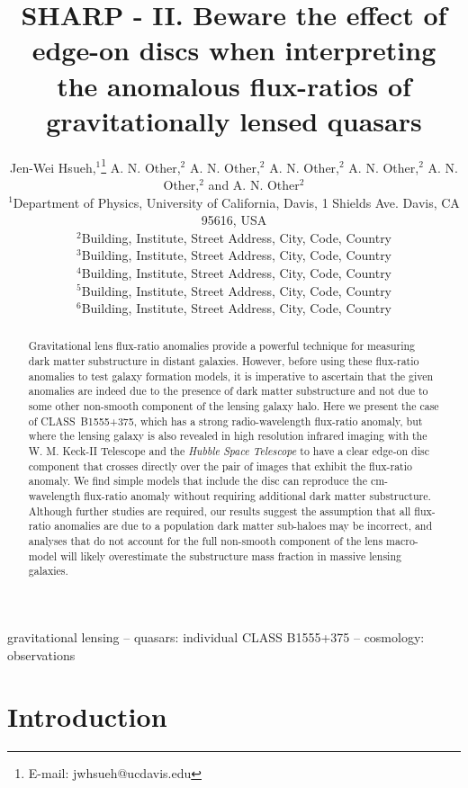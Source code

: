 \documentclass[a4paper,fleqn,usenatbib,useAMS]{mnras}
\title[Beware the effect of edge-on discs]{SHARP - II. Beware the effect of edge-on discs when interpreting the anomalous flux-ratios of gravitationally lensed quasars}
\author[Hsueh et al.]{Jen-Wei Hsueh,$^{1}$\thanks{E-mail: jwhsueh@ucdavis.edu} A. N. Other,$^{2}$ A. N. Other,$^{2}$  A. N. Other,$^{2}$ A. N. Other,$^{2}$ A. N. Other,$^{2}$
\newauthor and A. N. Other$^{2}$\\
$^{1}$Department of Physics, University of California, Davis, 1 Shields Ave. Davis, CA 95616, USA\\
$^{2}$Building, Institute, Street Address, City, Code, Country\\
$^{3}$Building, Institute, Street Address, City, Code, Country\\
$^{4}$Building, Institute, Street Address, City, Code, Country\\
$^{5}$Building, Institute, Street Address, City, Code, Country\\
$^{6}$Building, Institute, Street Address, City, Code, Country}
\begin{document}

\pagerange{\pageref{firstpage}--\pageref{lastpage}} 

\maketitle

\label{firstpage}

\begin{abstract}
Gravitational lens flux-ratio anomalies provide a powerful technique for measuring dark matter substructure in distant galaxies. However, before using these flux-ratio anomalies to test galaxy formation models, it is imperative to ascertain that the given anomalies are indeed due to the presence of dark matter substructure and not due to some other non-smooth component of the lensing galaxy halo. Here we present the case of CLASS~B1555+375, which has a strong radio-wavelength flux-ratio anomaly, but where the lensing galaxy is also revealed in high resolution infrared imaging with the W. M. Keck-II Telescope and the {\it Hubble Space Telescope} to have a clear edge-on disc component that crosses directly over the pair of images that exhibit the flux-ratio anomaly. We find simple models that include the disc can reproduce the cm-wavelength flux-ratio anomaly without requiring additional dark matter substructure. Although further studies are required, our results suggest the assumption that all flux-ratio anomalies are due to a population dark matter sub-haloes may be incorrect, and analyses that do not account for the full non-smooth component of the lens macro-model will likely overestimate the substructure mass fraction in massive lensing galaxies.
\end{abstract}

\begin{keywords}
gravitational lensing -- quasars: individual CLASS B1555+375 -- cosmology: observations 
\end{keywords}

\section{Introduction}
\end{document}
